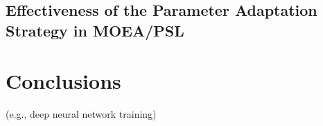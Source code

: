 \documentclass[journal]{IEEEtran}
\begin{document}
\subsection{Effectiveness of the Parameter Adaptation Strategy in MOEA/PSL}

\section{Conclusions}


 (e.g., deep neural network training)

\ifCLASSOPTIONcaptionsoff
  \newpage
\fi




\end{document}

